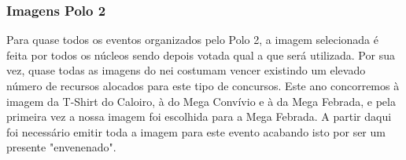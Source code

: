 
\subsubsection{Imagens Polo 2}

Para quase todos os eventos organizados pelo Polo 2, a imagem selecionada é feita por todos os núcleos sendo depois votada qual a que será utilizada. Por sua vez, quase todas as imagens do \acrshort{nei} costumam vencer existindo um elevado número de recursos alocados para este tipo de concursos. Este ano concorremos à imagem da T-Shirt do Caloiro, à do Mega Convívio e à da Mega Febrada, e pela primeira vez a nossa imagem foi escolhida para a Mega Febrada. A partir daqui foi necessário emitir toda a imagem para este evento acabando isto por ser um presente "envenenado".